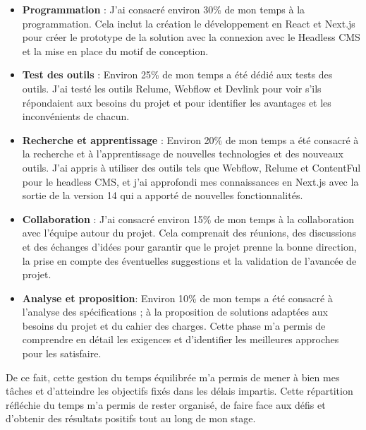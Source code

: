 \begin{itemize}
\item \textbf{Programmation} : J'ai consacré environ 30\% de mon temps à la programmation. Cela inclut la création le développement en React et Next.js pour créer le prototype de la solution avec la connexion avec le Headless CMS et la mise en place du motif de conception.

\item \textbf{Test des outils} : Environ 25\% de mon temps a été dédié aux tests des outils. J'ai testé les outils Relume, Webflow et Devlink pour voir s'ils répondaient aux besoins du projet et pour identifier les avantages et les inconvénients de chacun.

\item \textbf{Recherche et apprentissage} : Environ 20\% de mon temps a été consacré à la recherche et à l'apprentissage de nouvelles technologies et des nouveaux outils. J'ai appris à utiliser des outils tels que Webflow, Relume et ContentFul pour le headless CMS, et j'ai approfondi mes connaissances en Next.js avec la sortie de la version 14 qui a apporté de nouvelles fonctionnalités.

\vspace*{1cm}
\item \textbf{Collaboration} : J'ai consacré environ 15\% de mon temps à la collaboration avec l'équipe autour du projet. Cela comprenait des réunions, des discussions et des échanges d'idées pour garantir que le projet prenne la bonne direction, la prise en compte des éventuelles suggestions et la validation de l'avancée de projet.

\item \textbf{Analyse et proposition}: Environ 10\% de mon temps a été consacré à l'analyse des spécifications ; à la proposition de solutions adaptées aux besoins du projet et du cahier des charges. Cette phase m'a permis de comprendre en détail les exigences et d'identifier les meilleures approches pour les satisfaire.
\end{itemize}

De ce fait, cette gestion du temps équilibrée m'a permis de mener à bien mes tâches et d'atteindre les objectifs fixés dans les délais impartis. Cette répartition réfléchie du temps m'a permis de rester organisé, de faire face aux défis et d'obtenir des résultats positifs tout au long de mon stage.
